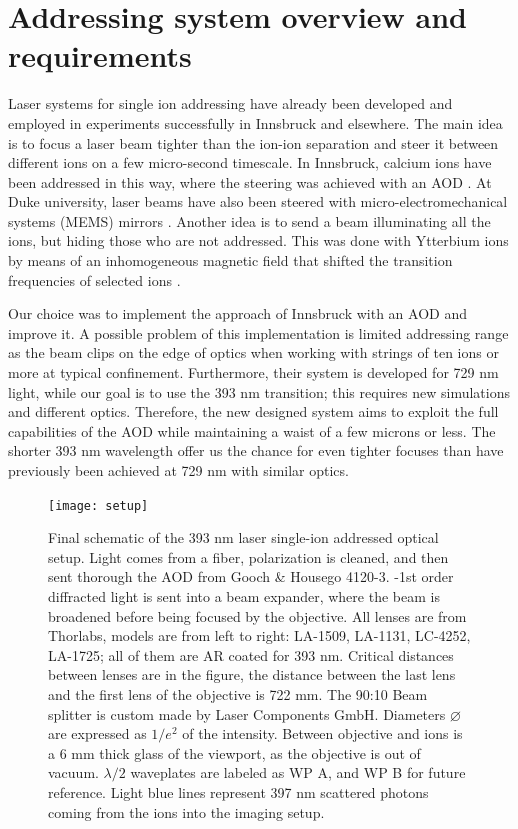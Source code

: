 \section{Addressing system overview and requirements}
\label{sec:addressing}
Laser systems for single ion addressing have already been developed and employed in experiments successfully in Innsbruck and elsewhere. The main idea is to focus a laser beam tighter than the ion-ion separation and steer it between different ions on a few micro-second timescale. In Innsbruck, calcium ions have been addressed in this way, where the steering was achieved with an AOD \cite{addressing}. At Duke university, laser beams have also been steered with micro-electromechanical systems (MEMS) mirrors \cite{addressing3}. Another idea is to send a beam illuminating all the ions, but hiding those who are not addressed. This was done with Ytterbium ions by means of an inhomogeneous magnetic field that shifted the transition frequencies of selected ions \cite{addressing2}. \par
Our choice was to implement the approach of Innsbruck \cite{addressing} with an AOD and improve it. A possible problem of this implementation is limited addressing range as the beam clips on the edge of optics when working with strings of ten ions or more at typical confinement. Furthermore, their system is developed for 729 nm light, while our goal is to use the 393 nm transition; this requires new simulations and different optics. Therefore, the new designed system aims to exploit the full capabilities of the AOD while maintaining a waist of a few microns or less. The shorter 393 nm wavelength offer us the chance for even tighter focuses than have previously been achieved at 729 nm with similar optics.
\begin{figure}
\centering
\texttt{[image: setup]}
\caption{Final schematic of the 393 nm laser single-ion addressed optical setup. Light comes from a fiber, polarization is cleaned, and then sent thorough the AOD from Gooch \& Housego 4120-3. -1st order diffracted light is sent into a beam expander, where the beam is broadened before being focused by the objective. All lenses are from Thorlabs, models are from left to right: LA-1509, LA-1131, LC-4252, LA-1725; all of them are AR coated for 393 nm. Critical distances between lenses are in the figure, the distance between the last lens and the first lens of the objective is 722 mm. The 90:10 Beam splitter is custom made by Laser Components GmbH. Diameters $\varnothing$ are expressed as $1/e^2$ of the intensity. Between objective and ions is a 6 mm thick glass of the viewport, as the objective is out of vacuum. $\lambda/2$ waveplates are labeled as WP A, and WP B for future reference. Light blue lines represent 397 nm scattered photons coming from the ions into the imaging setup.}
\label{addressingsetup}
\end{figure}
